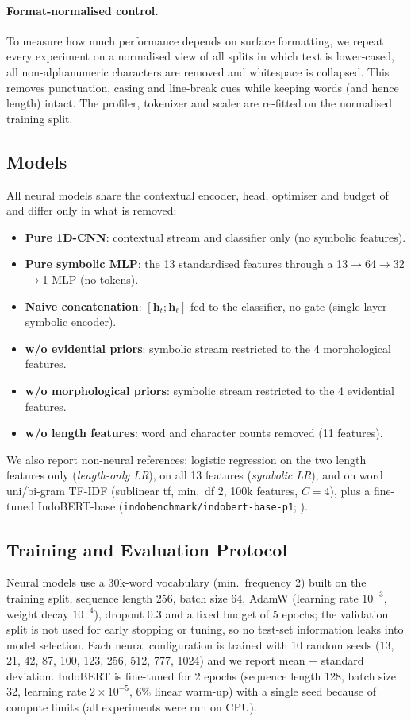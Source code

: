 \paragraph{Format-normalised control.}
To measure how much performance depends on surface formatting, we repeat every experiment on a
normalised view of all splits in which text is lower-cased, all non-alphanumeric characters are removed
and whitespace is collapsed. This removes punctuation, casing and line-break cues while keeping words
(and hence length) intact. The profiler, tokenizer and scaler are re-fitted on the normalised training
split.

\subsection{Models}
All neural models share the contextual encoder, head, optimiser and budget of \menet{} and differ only in
what is removed:
\begin{itemize}\itemsep0pt
\item \textbf{Pure 1D-CNN}: contextual stream and classifier only (no symbolic features).
\item \textbf{Pure symbolic MLP}: the 13 standardised features through a 13$\to$64$\to$32$\to$1 MLP (no tokens).
\item \textbf{Naive concatenation}: $[\mathbf{h}_t;\mathbf{h}_\ell]$ fed to the classifier, no gate (single-layer symbolic encoder).
\item \textbf{\menet{} w/o evidential priors}: symbolic stream restricted to the 4 morphological features.
\item \textbf{\menet{} w/o morphological priors}: symbolic stream restricted to the 4 evidential features.
\item \textbf{\menet{} w/o length features}: word and character counts removed (11 features).
\end{itemize}
We also report non-neural references: logistic regression on the two length features only
(\emph{length-only LR}), on all 13 features (\emph{symbolic LR}), and on word uni/bi-gram TF-IDF
(sublinear tf, min.\ df 2, 100k features, $C{=}4$), plus a fine-tuned IndoBERT-base
(\texttt{indobenchmark/indobert-base-p1}; \citealp{wilie2020indonlu}).

\subsection{Training and Evaluation Protocol}
Neural models use a 30k-word vocabulary (min.\ frequency 2) built on the training split, sequence length
256, batch size 64, AdamW (learning rate $10^{-3}$, weight decay $10^{-4}$), dropout 0.3 and a fixed budget
of 5 epochs; the validation split is not used for early stopping or tuning, so no test-set information
leaks into model selection. Each neural configuration is trained with 10 random seeds
(13, 21, 42, 87, 100, 123, 256, 512, 777, 1024) and we report mean $\pm$ standard deviation.
IndoBERT is fine-tuned for 2 epochs (sequence length 128, batch size 32, learning rate $2{\times}10^{-5}$,
6\% linear warm-up) with a single seed because of compute limits (all experiments were run on CPU).

